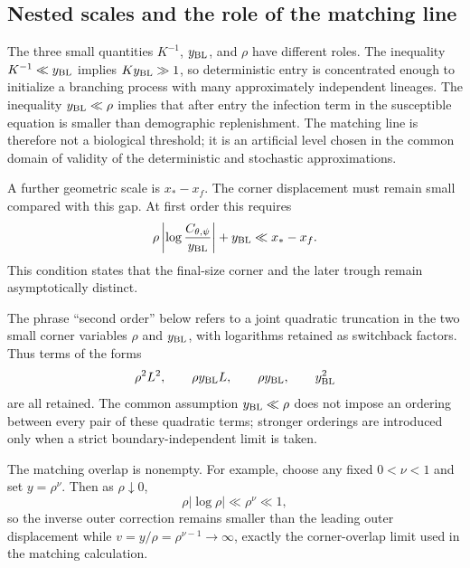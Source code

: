 \documentclass[11pt]{article}
\begin{document}
\subsection{Nested scales and the role of the matching line}
The three small quantities \(K^{-1}\), \(y_{\rm BL}\), and \(\rho\) have different roles. The inequality \(K^{-1}\ll y_{\rm BL}\) implies \(Ky_{\rm BL}\gg1\), so deterministic entry is concentrated enough to initialize a branching process with many approximately independent lineages. The inequality \(y_{\rm BL}\ll\rho\) implies that after entry the infection term in the susceptible equation is smaller than demographic replenishment. The matching line is therefore not a biological threshold; it is an artificial level chosen in the common domain of validity of the deterministic and stochastic approximations.

A further geometric scale is \(x_*-x_f\). The corner displacement must remain small compared with this gap. At first order this requires
\[
\rho\left|\log\frac{C_{\theta,\psi}}{y_{\rm BL}}\right|+y_{\rm BL}\ll x_*-x_f.
\]
This condition states that the final-size corner and the later trough remain asymptotically distinct.

The phrase ``second order'' below refers to a joint quadratic truncation in the two small corner variables \(\rho\) and \(y_{\rm BL}\), with logarithms retained as switchback factors. Thus terms of the forms
\[
\rho^2L^2,\qquad \rho y_{\rm BL}L,\qquad \rho y_{\rm BL},\qquad y_{\rm BL}^2
\]
are all retained. The common assumption \(y_{\rm BL}\ll\rho\) does not impose an ordering between every pair of these quadratic terms; stronger orderings are introduced only when a strict boundary-independent limit is taken.

The matching overlap is nonempty. For example, choose any fixed \(0<\nu<1\) and set \(y=\rho^\nu\). Then as \(\rho\downarrow0\),
\[
\rho|\log\rho|\ll \rho^\nu\ll1,
\]
so the inverse outer correction remains smaller than the leading outer displacement while \(v=y/\rho=\rho^{\nu-1}\to\infty\), exactly the corner-overlap limit used in the matching calculation.
\end{document}
